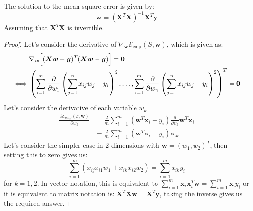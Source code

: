 \begin{proposition}
    The solution to the mean-square error is given by:
    \begin{equation*}
        \boldsymbol w = (\boldsymbol X^T\boldsymbol X)^{-1}\boldsymbol X^T\boldsymbol y
    \end{equation*}
    Assuming that $\boldsymbol X^T\boldsymbol X$ is invertible. 
\end{proposition}
\begin{proof}
    Let's consider the derivative of $\nabla_{\boldsymbol w}\mathcal{E}_\text{emp}(S, \boldsymbol w)$, which is given as:
    \begin{equation*}
    \begin{aligned}
        &\nabla_{\boldsymbol w} \Big[ (\boldsymbol X\boldsymbol w - \boldsymbol y)^T(\boldsymbol X\boldsymbol w - \boldsymbol y) \Big] = \boldsymbol 0 \\
        \iff& \left( \sum^m_{i=1}\frac{\partial}{\partial w_1}\left( \sum^n_{j=1} x_{ij}w_j - y_i  \right)^2, \dots, \sum^m_{i=1}\frac{\partial}{\partial w_n}\left( \sum^n_{j=1} x_{ij}w_j - y_i  \right)^2 \right)^T = \boldsymbol 0
    \end{aligned}
    \end{equation*}
    Let's consider the derivative of each variable $w_k$
    \begin{equation*}
    \begin{aligned}
        \frac{\partial \mathcal{E}_\text{emp}(S, \boldsymbol w)}{\partial w_k} &= \frac{2}{m} \sum^m_{i=1} (\boldsymbol w^T\boldsymbol x_i - y_i)\frac{\partial }{\partial w_k}\boldsymbol w^T\boldsymbol x_i \\
        &= \frac{2}{m}\sum^m_{i=1}(\boldsymbol w^T\boldsymbol x_i - y_i)\boldsymbol x_{ik}
    \end{aligned}
    \end{equation*}
    Let's consider the simpler case in $2$ dimensions with $\boldsymbol w = (w_1, w_2)^T$, then setting this to zero gives us:
    \begin{equation*}
        \sum^m_{i=1} (x_{ij}x_{i1}w_1 + x_{ik}x_{i2}w_2) = \sum^m_{i=1}x_{ik}y_i
    \end{equation*}
    for $k=1,2$. In vector notation, this is equivalent to $\sum^m_{i=1}\boldsymbol x_i\boldsymbol x_i^T\boldsymbol w = \sum^m_{i=1}\boldsymbol x_iy_i$ or it is equivalent to matrix notation is: $\boldsymbol X^T\boldsymbol X\boldsymbol w = \boldsymbol X^T\boldsymbol y$, taking the inverse gives us the required answer. 
\end{proof}

